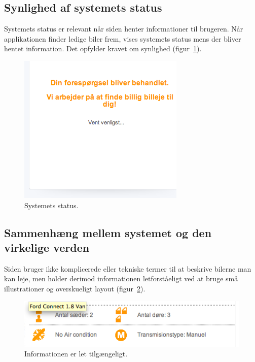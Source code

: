 \documentclass[a4paper]{article}
\begin{document}
\subsection{Synlighed af systemets status}
Systemets status er relevant når siden henter informationer til brugeren. Når
applikationen finder ledige biler frem, vises systemets status mens der bliver
hentet information. Det opfylder kravet om synlighed (figur~\ref{status}).

\begin{figure}[htbp]
  \begin{center}
    \includegraphics[scale=.6]{4.png}
  \end{center}
  \caption{Systemets status.}
  \label{status}
\end{figure}

\subsection{Sammenhæng mellem systemet og den virkelige verden}
Siden bruger ikke komplicerede eller tekniske termer til at beskrive bilerne man
kan leje, men holder derimod informationen letforståeligt ved at bruge
små illustrationer og overskueligt layout (figur~\ref{sprog}).

\begin{figure}[htbp]
  \begin{center}
    \includegraphics[scale=.6]{5.png}
  \end{center}
  \caption{Informationen er let tilgængeligt.}
  \label{sprog}
\end{figure}
\end{document}
